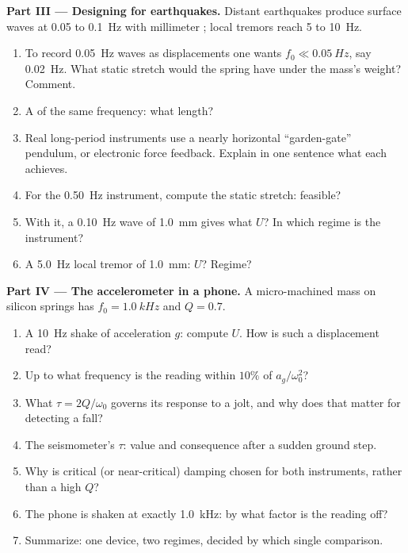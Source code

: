 \begin{problem}
\medskip
\noindent\textbf{Part III --- Designing for earthquakes.}
Distant earthquakes produce surface waves at \qty{0.05}{} to \qty{0.1}{Hz}
with millimeter ; local tremors reach \qty{5}{} to \qty{10}{Hz}.
\begin{enumerate}[resume]
  \item To record \qty{0.05}{Hz} waves as displacements one wants
        $f_0 \ll \qty{0.05}{Hz}$, say \qty{0.02}{Hz}. What static
        stretch would the spring have under the mass's weight? Comment.
  \item A  of the same frequency: what length?
  \item Real long-period instruments use a nearly horizontal
        ``garden-gate'' pendulum, or electronic force feedback. Explain
        in one sentence what each achieves.
  \item For the \qty{0.50}{Hz} instrument, compute the static stretch:
        feasible?
  \item With it, a \qty{0.10}{Hz} wave of  \qty{1.0}{mm} gives
        what $U$? In which regime is the instrument?
  \item A \qty{5.0}{Hz} local tremor of  \qty{1.0}{mm}: $U$?
        Regime?
\end{enumerate}

\medskip
\noindent\textbf{Part IV --- The accelerometer in a phone.}
A micro-machined mass on silicon springs has $f_0 = \qty{1.0}{kHz}$ and
$Q = 0.7$.
\begin{enumerate}[resume]
  \item A \qty{10}{Hz} shake of acceleration  $g$: compute
        $U$. How is such a displacement read?
  \item Up to what frequency is the reading within $10\%$ of $a_g/\omega_0^2$?
  \item What  $\tau = 2Q/\omega_0$ governs its response to a
        jolt, and why does that matter for detecting a fall?
  \item The seismometer's $\tau$: value and consequence after a sudden
        ground step.
  \item Why is critical (or near-critical) damping chosen for both
        instruments, rather than a high $Q$?
  \item The phone is shaken at exactly \qty{1.0}{kHz}: by what factor is
        the reading off?
  \item Summarize: one device, two regimes, decided by which single
        comparison.
\end{enumerate}
\end{problem}
